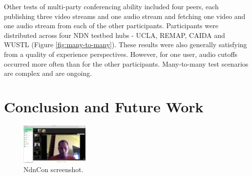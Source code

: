 \documentclass{icn/sig-alternate-2013} %
\newcommand{\ndnconName}{NdnCon}
\begin{document}
Other tests of multi-party conferencing ability included four peers, each publishing three video streams and one audio stream and fetching one video and one audio stream from each of the other participants. Participants were distributed across four NDN testbed hubs - UCLA, REMAP, CAIDA and WUSTL (Figure \ref{fig:many-to-many}). These results were also generally satisfying from a quality of experience perspectives. However, for one user, audio cutoffs occurred more often than for the other participants. Many-to-many test scenarios are complex and are ongoing.

\section{Conclusion and Future Work}
\label{sec:conclusion}

\begin{figure}[t!]
\centering
\includegraphics[width=0.3\textwidth]{ndncon}
\caption{\ndnconName{} screenshot.}
\label{fig:ndncon}
\end{figure}

\end{document}
